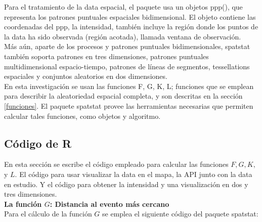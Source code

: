 \documentclass[12pt]{report}
\begin{document}
			Para el tratamiento de la data espacial, el paquete usa un objetos ppp(), que representa los patrones puntuales espaciales bidimensional. El objeto contiene las coordenadas del ppp, la intensidad,  también  incluye la región  donde los puntos de la data ha sido observada (región acotada),  llamada ventana de observación.\\
	
			
		    Más aún, aparte de los procesos y  patrones puntuales bidimensionales, spatstat también soporta patrones en tres dimensiones, patrones puntuales multidimensional espacio-tiempo,  patrones de líneas de segmentos, tessellations espaciales y conjuntos aleatorios en dos dimensiones.\\
	 
			 
			 En esta investigación se usan las funciones  F, G, K, L; funciones que se emplean para  describir la aleatoriedad espacial completa, y son descritas en la sección \ref{funciones}.   El paquete spatstat  provee las herramientas necesarias que permiten calcular tales  funciones, como objetos y algoritmo. \\
			
		
			
			
			\subsection{Código de R }{\label{codigo} }
				
				En esta sección se escribe el código empleado para calcular las funciones $ F, G, K, $ y $ L$. El código para usar visualizar la data en el mapa, la API junto con la data en estudio. Y el código para obtener la intensidad y una visualización en dos y tres dimensiones.\\
						
\textbf{La función $G$: Distancia al evento más cercano}{\label{G-codigo} }\\
			
			
		    Para el cálculo de la función $G$ se emplea el siguiente código del paquete spatstat:  	\\
				
		
			
		
\end{document}
